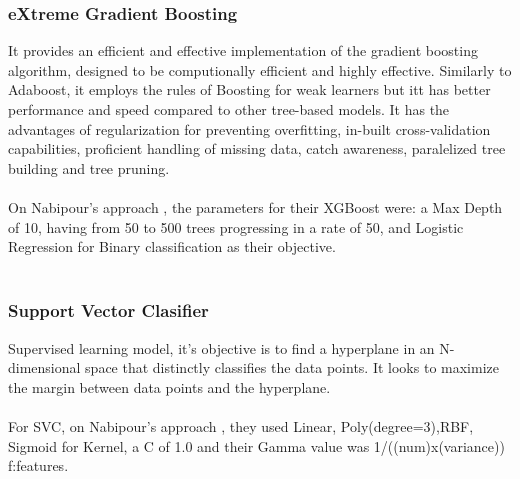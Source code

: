 \documentclass[conference]{IEEEtran}
\begin{document}
\subsubsection{eXtreme Gradient Boosting}
It provides an efficient and effective implementation of the gradient boosting algorithm, designed to be computionally efficient
and highly effective. Similarly to Adaboost, it employs the rules of Boosting for weak learners but itt has better performance and speed compared to other tree-based models. It has the advantages of regularization for preventing
overfitting, in-built cross-validation capabilities, proficient handling of missing data, catch awareness, paralelized tree building and tree pruning.
\\\\
On Nabipour's approach \cite{nabipour2020predicting}, the parameters for their XGBoost were: a Max Depth of 10, having from 50 to 500 trees progressing in a rate of 50, and Logistic Regression for Binary classification as their objective.
\\\\
\subsubsection{Support Vector Clasifier}
Supervised learning model, it's objective is to find a hyperplane in an N-dimensional space that
distinctly classifies the data points. It looks to maximize the margin between data points and the hyperplane.
\\\\
For SVC, on Nabipour's approach \cite{nabipour2020predicting}, they used Linear, Poly(degree=3),RBF, Sigmoid for Kernel, a C of 1.0 and their Gamma value was 1/((num)x(variance)) f:features.
\\\\
\end{document}
